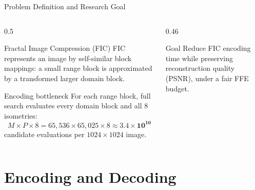 \documentclass[10pt,aspectratio=169]{beamer}
\begin{document}
\begin{frame}{Problem Definition and Research Goal}
  \begin{columns}[T,onlytextwidth]
    \begin{column}{0.5\textwidth}
      \begin{block}{Fractal Image Compression (FIC)}
        FIC represents an image by self-similar block mappings:
        a small \alert{range block} is approximated by a transformed larger
        \alert{domain block}.
      \end{block}
      \begin{alertblock}{Encoding bottleneck}
        For each range block, full search evaluates every domain block and all 8
        isometries:
        \[
          M\times P\times 8
          =65{,}536\times65{,}025\times8
          \approx \mathbf{3.4\times10^{10}}
        \]
        candidate evaluations per $1024\times1024$ image.
      \end{alertblock}
    \end{column}
    \hfill
    \begin{column}{0.46\textwidth}
      \centering
      \vspace{0.2cm}
      \begin{exampleblock}{Goal}
        Reduce FIC encoding time while preserving reconstruction quality
        (PSNR), under a fair FFE budget.
      \end{exampleblock}
    \end{column}
  \end{columns}
\end{frame}

\section{Encoding and Decoding}
\end{document}
